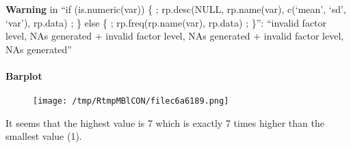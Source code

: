 \documentclass{article}
\makeatletter
\def\maxwidth{\ifdim\Gin@nat@width>\linewidth\linewidth
\else\Gin@nat@width\fi}
\let\Oldincludegraphics\includegraphics
\renewcommand{\includegraphics}[1]{\Oldincludegraphics[width=\maxwidth]{#1}}
\makeatother
\begin{document}
\textbf{Warning} in ``if (is.numeric(var)) \{ ; rp.desc(NULL,
rp.name(var), c(`mean', `sd', `var'), rp.data) ; \} else \{ ;
rp.freq(rp.name(var), rp.data) ; \}'': ``invalid factor level, NAs
generated + invalid factor level, NAs generated + invalid factor level,
NAs generated''

\paragraph{Barplot}

\begin{figure}[htbp]
\centering
\texttt{[image: /tmp/RtmpMBlCON/filec6a6189.png]}
\caption{}
\end{figure}

It seems that the highest value is 7 which is exactly 7 times higher
than the smallest value (1).
\end{document}
